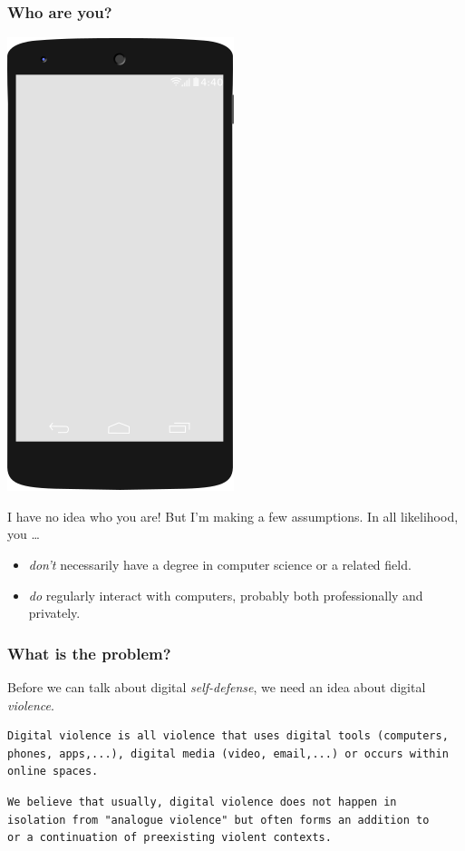 \documentclass[aspectratio=169,dvipsnames]{beamer}
\begin{document}
\begin{frame}
\frametitle{Who are you?}
\begin{minipage}{0.4\textwidth}
\begin{center}
\includegraphics[scale=0.4]{images/smartphone} 
\end{center}
\end{minipage}%
\begin{minipage}{0.6\textwidth}
I have no idea who you are! But I'm making a few assumptions. 
In all likelihood, you \dots
\medskip

\begin{itemize}
\pause\item\emph{don't} necessarily have a degree in computer science or a related field.
\pause\item\emph{do} regularly interact with computers, probably both professionally and privately.
\end{itemize}
\end{minipage}
\end{frame}

\begin{frame}[fragile]
\frametitle{What is the problem?}

Before we can talk about digital \emph{self-defense}, we need an idea about digital \emph{violence}.
\pause\bigskip

\begin{verbatim}
Digital violence is all violence that uses digital tools (computers,
phones, apps,...), digital media (video, email,...) or occurs within
online spaces.
\end{verbatim}
\pause
\begin{verbatim}
We believe that usually, digital violence does not happen in
isolation from "analogue violence" but often forms an addition to
or a continuation of preexisting violent contexts.

\end{verbatim}
\end{frame}
\end{document}
